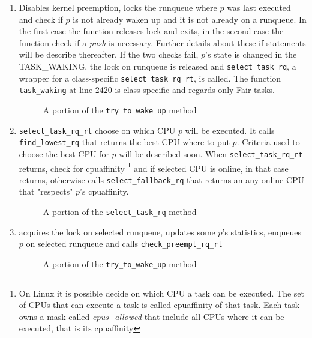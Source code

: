 \begin{enumerate}
\item Disables kernel preemption, locks the runqueue where $p$ was last executed and check 
if $p$ is not already waken up and it is not already on a runqueue. In the first case the 
function releases lock and exits, in the second case the function check if a
\textit{push} is necessary. Further details about these if statements will be
describe thereafter. If the two checks fail, $p$'s state is changed in the TASK\_WAKING, the
lock on runqueue is released and \texttt{select\_task\_rq}, a wrapper for a 
class-specific \texttt{select\_task\_rq\_rt}, is called. The function 
\texttt{task\_waking} at line 2420 is class-specific and regards only Fair tasks.

\begin{figure}[h]
  \lstset{basicstyle=\footnotesize, language=c, captionpos=b, frame=single,label=lis:steps}
  
  \label{code:steps_ttwu}
  \caption{A portion of the \texttt{try\_to\_wake\_up} method}
\end{figure}

\item \texttt{select\_task\_rq\_rt} choose on which CPU $p$ will be executed. It
calls \texttt{find\_lowest\_rq} that returns the best CPU where to put $p$. Criteria
used to choose the best CPU for $p$ will be described soon. When \texttt{select\_task\_rq\_rt} 
returns, check for cpuaffinity \footnote{On Linux it is possible decide on which
CPU a task can be executed. The set of CPUs that can execute a task is called 
cpuaffinity of that task. Each task owns a mask called \textit{cpus\_allowed} 
that include all CPUs where it can be executed, that is its cpuaffinity} and 
if selected CPU is online, in that case returns, otherwise calls 
\texttt{select\_fallback\_rq} that returns an any online CPU that "respects" 
$p$'s cpuaffinity.

\begin{figure}[h]
  \lstset{basicstyle=\footnotesize, language=c, captionpos=b, frame=single,label=lis:steps}
  
  \label{code:select_task}
  \caption{A portion of the \texttt{select\_task\_rq} method}
\end{figure}

\item acquires the lock on selected runqueue, updates some $p$'s statistics, enqueues 
$p$ on selected runqueue and calls \texttt{check\_preempt\_rq\_rt} 

\begin{figure}[h]
  \lstset{basicstyle=\footnotesize, language=c, captionpos=b, frame=single,label=lis:steps}
  
  \label{code:check_preempt}
  \caption{A portion of the \texttt{try\_to\_wake\_up} method}
\end{figure}


\end{enumerate}
